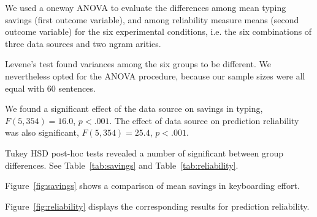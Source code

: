 \documentclass{sigchi}
\begin{document}
We used a oneway ANOVA to evaluate the differences among mean typing
savings (first outcome variable), and among reliability measure means
(second outcome variable) for the six experimental conditions, i.e.
the six combinations of three data sources and two ngram arities.

Levene's test found variances among the six groups to be different.
We nevertheless opted for the ANOVA procedure, because our sample
sizes were all equal with 60 sentences.

We found a significant effect of the data source on savings in typing,
$F(5,354)=16.0$, $p<.001$. The effect of data source on prediction
reliability was also significant, $F(5,354)=25.4$, $p<.001$.

Tukey HSD post-hoc tests revealed a number of significant between group
differences. See Table~\ref{tab:savings} and Table~\ref{tab:reliability}.

Figure~\ref{fig:savings} shows a comparison of mean savings in
keyboarding effort.

Figure~\ref{fig:reliability} displays the corresponding results for
prediction reliability.

\begingroup
\everymath{\scriptstyle}
\tiny
\end{document}
